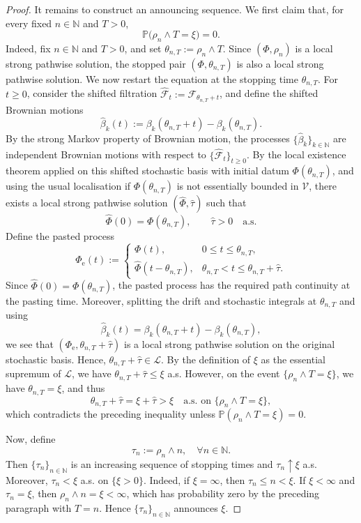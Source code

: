 \documentclass[11pt, reqno]{amsart}
\theoremstyle{definition}
\numberwithin{equation}{section}
\begin{document}
\begin{proof}
It remains to construct an announcing sequence. We first claim that, for
every fixed $n\in\mathbb N$ and $T>0$,
\[
\mathbb P\big(\rho_n\wedge T=\xi\big)=0.
\]
Indeed, fix $n\in\mathbb N$ and $T>0$, and set $\theta_{n,T}:=\rho_n\wedge T$.
Since $(\Phi,\rho_n)$ is a local strong pathwise solution, the stopped pair
$(\Phi,\theta_{n,T})$ is also a local strong pathwise solution. We now
restart the equation at the stopping time $\theta_{n,T}$. For $t\geq 0$, consider the
shifted filtration $\widehat{\mathcal F}_t:=\mathcal F_{\theta_{n,T}+t}$,
and define the shifted Brownian motions
\[
\widehat\beta_k(t)
:=
\beta_k(\theta_{n,T}+t)-\beta_k(\theta_{n,T}).
\]
By the strong Markov property of Brownian motion, the processes
$\{\widehat\beta_k\}_{k\in\mathbb N}$ are independent Brownian motions with
respect to $\{\widehat{\mathcal F}_t\}_{t\geq0}$.
By the local existence theorem applied on this shifted stochastic basis
with initial datum $\Phi(\theta_{n,T})$, and using the usual localisation if
$\Phi(\theta_{n,T})$ is not essentially bounded in $\mathcal V$, there exists a local strong
pathwise solution $(\widehat\Phi,\widehat\tau)$ such that
\[
\widehat\Phi(0)=\Phi(\theta_{n,T}),
\qquad
\widehat\tau>0
\quad\text{a.s.}
\]
Define the pasted process
\[
\Phi_{\mathrm e}(t):=
\begin{cases}
	\Phi(t), & 0\leq t\leq \theta_{n,T},\\[1mm]
	\widehat\Phi(t-\theta_{n,T}),
	& \theta_{n,T}<t\leq \theta_{n,T}+\widehat\tau .
\end{cases}
\]
Since $\widehat\Phi(0)=\Phi(\theta_{n,T})$, the pasted process has the
required path continuity at the pasting time. Moreover, splitting the drift
and stochastic integrals at $\theta_{n,T}$ and using
\[
\widehat\beta_k(t)
=
\beta_k(\theta_{n,T}+t)-\beta_k(\theta_{n,T}),
\]
we see that $(\Phi_{\mathrm e},\theta_{n,T}+\widehat\tau)$ is a local
strong pathwise solution on the original stochastic basis.
Hence, $\theta_{n,T}+\widehat\tau\in\mathcal L$. By the
definition of $\xi$ as the essential supremum of $\mathcal{L}$, we have $\theta_{n,T}+\widehat\tau\leq \xi$ a.s.
However, on the event $\{\rho_n\wedge T=\xi\}$, we have
$\theta_{n,T}=\xi$, and thus
\[
\theta_{n,T}+\widehat\tau
=
\xi+\widehat\tau
>
\xi
\quad\text{a.s. on } \{\rho_n\wedge T=\xi\},
\]
which contradicts the preceding inequality unless $\mathbb P(\rho_n\wedge T=\xi)=0$.
	
Now, define
	\[
	\tau_n:=\rho_n\wedge n,
	\quad \forall n\in\mathbb N.
	\]
	Then $\{\tau_n\}_{n\in\mathbb N}$ is an increasing sequence of stopping
	times and $\tau_n\uparrow\xi$ a.s.
	Moreover, $\tau_n<\xi$ a.s. on $\{\xi>0\}$. Indeed, if $\xi=\infty$, then
	$\tau_n\leq n<\xi$. If $\xi<\infty$ and $\tau_n=\xi$, then $\rho_n\wedge n=\xi<\infty$,
	which has probability zero by the preceding paragraph with $T=n$. Hence
	$\{\tau_n\}_{n\in\mathbb N}$ announces $\xi$.
	

\end{proof}
\end{document}
